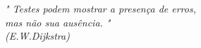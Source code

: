 

\begin{comment}
‘‘
\end{comment}


\begin{epigrafe}
\vspace*{\fill}
\begin{flushright}
\textit{" Testes podem mostrar a presença de erros, \\
mas não sua ausência. " \\
(E.W.Dijkstra)}
\end{flushright}
\end{epigrafe}

